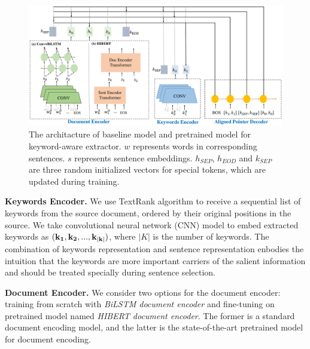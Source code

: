 \begin{figure}[th]
    \centering
    \includegraphics[width=0.85\linewidth]{model.pdf}
    \caption{The architacture of baseline model and pretrained model for keyword-aware extractor. $w$ represents words in corresponding sentences. $s$ represents sentence embeddings. $h_{SEP}$, $h_{EOD}$ and $k_{SEP}$ are three random initialized vectors for special tokens, which are updated during training.}
    \label{fig:model}
\end{figure}


\textbf{Keywords Encoder.} 
We use TextRank algorithm to 
receive a sequential list of keywords 
from the source document, 
ordered by their original positions in the source. 
We take convolutional neural network (CNN) model to embed extracted keywords as $(\bf k_1, \bf k_2,..., \bf k_{|k|})$,
where $|K|$ is the number of keywords.
The combination of keywords representation and sentence representation
enbodies the intuition that the keywords are more important carriers of
the salient information and should be treated specially during sentence selection.

\textbf{Document Encoder.}
We consider two options for the document encoder:
training from scratch with \textit{BiLSTM document encoder} and fine-tuning on pretrained model named 
\textit{HIBERT document encoder}. 
The former is a standard document encoding model, and the latter is the state-of-the-art pretrained model for document encoding. 

